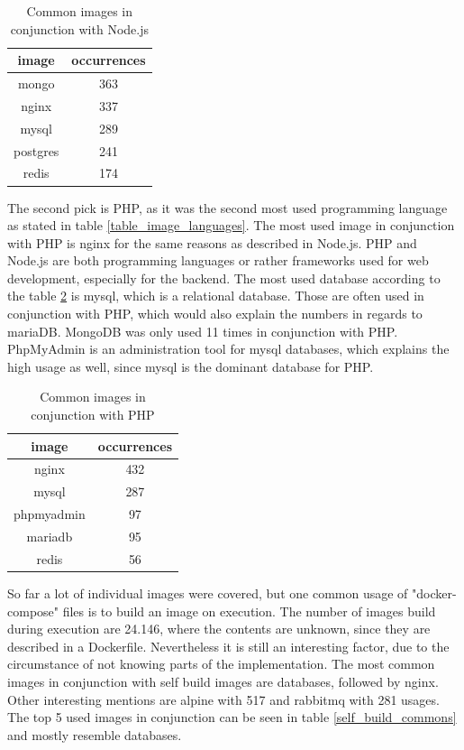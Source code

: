 \begin{table}[h!]
    \centering
    \begin{tabular}{ |c|c| }
    \hline
    image & occurrences \\
    \hline
         mongo & 363 \\
         nginx & 337 \\
         mysql & 289 \\
         postgres & 241 \\
         redis & 174 \\
    \hline
    \end{tabular}
    \caption{Common images in conjunction with Node.js}
    \label{node_commons}
\end{table}

The second pick is PHP, as it was the second most used programming language as stated in table \ref{table_image_languages}. The most used image in conjunction with PHP is nginx for the same reasons as described in Node.js. PHP and Node.js are both programming languages or rather frameworks used for web development, especially for the backend. The most used database according to the table \ref{php_commons} is mysql, which is a relational database. Those are often used in conjunction with PHP, which would also explain the numbers in regards to mariaDB. MongoDB was only used 11 times in conjunction with PHP. PhpMyAdmin is an administration tool for mysql databases, which explains the high usage as well, since mysql is the dominant database for PHP.

\begin{table}[h!]
    \centering
    \begin{tabular}{ |c|c| }
    \hline
    image & occurrences \\
    \hline
         nginx & 432 \\
         mysql & 287 \\
         phpmyadmin & 97 \\
         mariadb & 95 \\
         redis & 56 \\
    \hline
    \end{tabular}
    \caption{Common images in conjunction with PHP}
    \label{php_commons}
\end{table}

So far a lot of individual images were covered, but one common usage of "docker-compose" files is to build an image on execution. The number of images build during execution are 24.146, where the contents are unknown, since they are described in a Dockerfile. Nevertheless it is still an interesting factor, due to the circumstance of not knowing parts of the implementation. The most common images in conjunction with self build images are databases, followed by nginx. Other interesting mentions are alpine with 517 and rabbitmq with 281 usages. The top 5 used images in conjunction can be seen in table \ref{self_build_commons} and mostly resemble databases.

